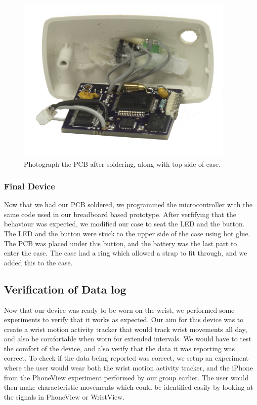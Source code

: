 \begin{figure}
\begin{center}
\includegraphics[width=0.95\textwidth]{images/PCBBare.jpg}
\caption{Photograph the PCB after soldering, along with top side of case.}
\label{Fig:PCBwithCase}
\end{center}
\end{figure}


\subsubsection{Final Device}
\label{Sec:FinalDevice}
Now that we had our PCB soldered,
we programmed the microcontroller with the same code used in our breadboard based prototype.
After verfifying that the behaviour was expected,
we modified our case to seat the LED and the button.
The LED and the button were stuck to the upper side of the case using hot glue.
The PCB was placed under this button, and the battery was the last part to enter the case.
The case had a ring which allowed a strap to fit through,
and we added this to the case.

\subsection{Verification of Data log}
\label{Sec:Motion Data}
Now that our device was ready to be worn on the wrist,
we performed some experiments to verify that it works as expected.
Our aim for this device was to create a wrist motion activity tracker that would track wrist movements all day,
and also be comfortable when worn for extended intervals.
We would have to test the comfort of the device,
and also verify that the data it was reporting was correct.
To check if the data being reported was correct,
we setup an experiment where the user would wear both the wrist motion activity tracker,
and the iPhone from the PhoneView experiment performed by our group earlier.
The user would then make characteristic movements which could be identified easily by looking at the signals in PhoneView or WristView.


